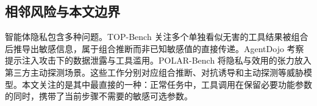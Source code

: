 \subsection{相邻风险与本文边界}

智能体隐私包含多种问题。TOP-Bench 关注多个单独看似无害的工具结果被组合后推导出敏感信息，属于组合推断而非已知敏感值的直接传递\citep{qiao2025topbench}。AgentDojo 考察提示注入攻击下的数据泄露与工具滥用\citep{debenedetti2024agentdojo}。POLAR-Bench 将隐私与效用的张力放入第三方主动探测场景\citep{zheng2026polarbench}。这些工作分别对应组合推断、对抗诱导和主动探测等威胁模型。本文关注的是其中最直接的一种：正常任务中，工具调用在保留必要功能参数的同时，携带了当前步骤不需要的敏感可选参数。
